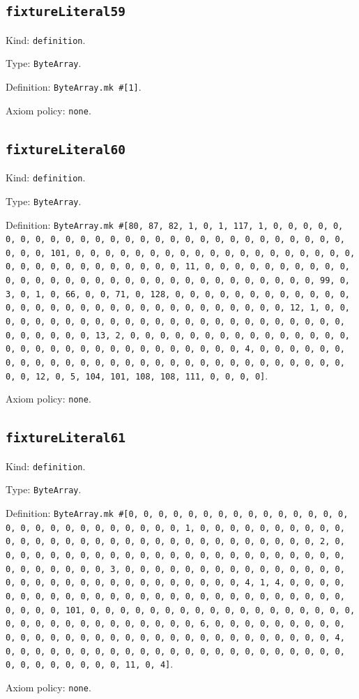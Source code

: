 \documentclass[11pt]{article}
\begin{document}
\subsection*{\texttt{fixtureLiteral59}}
\noindent Kind: \texttt{definition}.\par
\noindent Type: \texttt{ByteArray}.\par
\noindent Definition: \texttt{ByteArray.mk \#[1]}.\par
\noindent Axiom policy: \texttt{none}.\par
\subsection*{\texttt{fixtureLiteral60}}
\noindent Kind: \texttt{definition}.\par
\noindent Type: \texttt{ByteArray}.\par
\noindent Definition: \texttt{ByteArray.mk \#[80, 87, 82, 1, 0, 1, 117, 1, 0, 0, 0, 0, 0, 0, 0, 0, 0, 0, 0, 0, 0, 0, 0, 0, 0, 0, 0, 0, 0, 0, 0, 0, 0, 0, 0, 0, 0, 0, 0, 101, 0, 0, 0, 0, 0, 0, 0, 0, 0, 0, 0, 0, 0, 0, 0, 0, 0, 0, 0, 0, 0, 0, 0, 0, 0, 0, 0, 0, 0, 0, 0, 11, 0, 0, 0, 0, 0, 0, 0, 0, 0, 0, 0, 0, 0, 0, 0, 0, 0, 0, 0, 0, 0, 0, 0, 0, 0, 0, 0, 0, 0, 0, 0, 99, 0, 3, 0, 1, 0, 66, 0, 0, 71, 0, 128, 0, 0, 0, 0, 0, 0, 0, 0, 0, 0, 0, 0, 0, 0, 0, 0, 0, 0, 0, 0, 0, 0, 0, 0, 0, 0, 0, 0, 0, 0, 0, 12, 1, 0, 0, 0, 0, 0, 0, 0, 0, 0, 0, 0, 0, 0, 0, 0, 0, 0, 0, 0, 0, 0, 0, 0, 0, 0, 0, 0, 0, 0, 0, 0, 13, 2, 0, 0, 0, 0, 0, 0, 0, 0, 0, 0, 0, 0, 0, 0, 0, 0, 0, 0, 0, 0, 0, 0, 0, 0, 0, 0, 0, 0, 0, 0, 0, 4, 0, 0, 0, 0, 0, 0, 0, 0, 0, 0, 0, 0, 0, 0, 0, 0, 0, 0, 0, 0, 0, 0, 0, 0, 0, 0, 0, 0, 0, 0, 0, 12, 0, 5, 104, 101, 108, 108, 111, 0, 0, 0, 0]}.\par
\noindent Axiom policy: \texttt{none}.\par
\subsection*{\texttt{fixtureLiteral61}}
\noindent Kind: \texttt{definition}.\par
\noindent Type: \texttt{ByteArray}.\par
\noindent Definition: \texttt{ByteArray.mk \#[0, 0, 0, 0, 0, 0, 0, 0, 0, 0, 0, 0, 0, 0, 0, 0, 0, 0, 0, 0, 0, 0, 0, 0, 0, 0, 0, 1, 0, 0, 0, 0, 0, 0, 0, 0, 0, 0, 0, 0, 0, 0, 0, 0, 0, 0, 0, 0, 0, 0, 0, 0, 0, 0, 0, 0, 0, 0, 0, 2, 0, 0, 0, 0, 0, 0, 0, 0, 0, 0, 0, 0, 0, 0, 0, 0, 0, 0, 0, 0, 0, 0, 0, 0, 0, 0, 0, 0, 0, 0, 0, 3, 0, 0, 0, 0, 0, 0, 0, 0, 0, 0, 0, 0, 0, 0, 0, 0, 0, 0, 0, 0, 0, 0, 0, 0, 0, 0, 0, 0, 0, 0, 0, 4, 1, 4, 0, 0, 0, 0, 0, 0, 0, 0, 0, 0, 0, 0, 0, 0, 0, 0, 0, 0, 0, 0, 0, 0, 0, 0, 0, 0, 0, 0, 0, 0, 0, 101, 0, 0, 0, 0, 0, 0, 0, 0, 0, 0, 0, 0, 0, 0, 0, 0, 0, 0, 0, 0, 0, 0, 0, 0, 0, 0, 0, 0, 0, 0, 0, 6, 0, 0, 0, 0, 0, 0, 0, 0, 0, 0, 0, 0, 0, 0, 0, 0, 0, 0, 0, 0, 0, 0, 0, 0, 0, 0, 0, 0, 0, 0, 0, 4, 0, 0, 0, 0, 0, 0, 0, 0, 0, 0, 0, 0, 0, 0, 0, 0, 0, 0, 0, 0, 0, 0, 0, 0, 0, 0, 0, 0, 0, 0, 0, 11, 0, 4]}.\par
\noindent Axiom policy: \texttt{none}.\par
\end{document}
